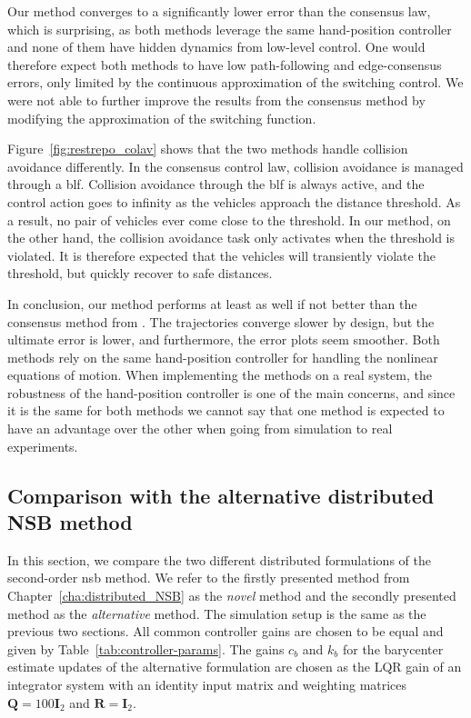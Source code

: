 Our method converges to a significantly lower error than the consensus law, which is surprising, as both methods leverage the same hand-position controller and none of them have hidden dynamics from low-level control. One would therefore expect both methods to have low path-following and edge-consensus errors, only limited by the continuous approximation of the switching control. We were not able to further improve the results from the consensus method by modifying the approximation of the switching function.

Figure~\ref{fig:restrepo_colav} shows that the two methods handle collision avoidance differently. In the consensus control law, collision avoidance is managed through a \gls{blf}. Collision avoidance through the \gls{blf} is always active, and the control action goes to infinity as the vehicles approach the distance threshold. As a result, no pair of vehicles ever come close to the threshold. In our method, on the other hand, the collision avoidance task only activates when the threshold is violated. It is therefore expected that the vehicles will transiently violate the threshold, but quickly recover to safe distances.

In conclusion, our method performs at least as well if not better than the consensus method from \cite{restrepo_tracking--formation_2022}. The trajectories converge slower by design, but the ultimate error is lower, and furthermore, the error plots seem smoother. Both methods rely on the same hand-position controller for handling the nonlinear equations of motion. When implementing the methods on a real system, the robustness of the hand-position controller is one of the main concerns, and since it is the same for both methods we cannot say that one method is expected to have an advantage over the other when going from simulation to real experiments.


\subsection{Comparison with the alternative distributed NSB method}\label{sec:sim_alternative}
In this section, we compare the two different distributed formulations of the second-order \gls{nsb} method. We refer to the firstly presented method from Chapter~\ref{cha:distributed_NSB} as the \textit{novel} method and the secondly presented method as the \textit{alternative} method. The simulation setup is the same as the previous two sections. All common controller gains are chosen to be equal and given by Table~\ref{tab:controller-params}. The gains $c_b$ and $k_b$ for the barycenter estimate updates of the alternative formulation are chosen as the LQR gain of an integrator system with an identity input matrix and weighting matrices $\mathbf{Q}=100\mathbf{I}_2$ and $\mathbf{R} = \mathbf{I}_2$.

